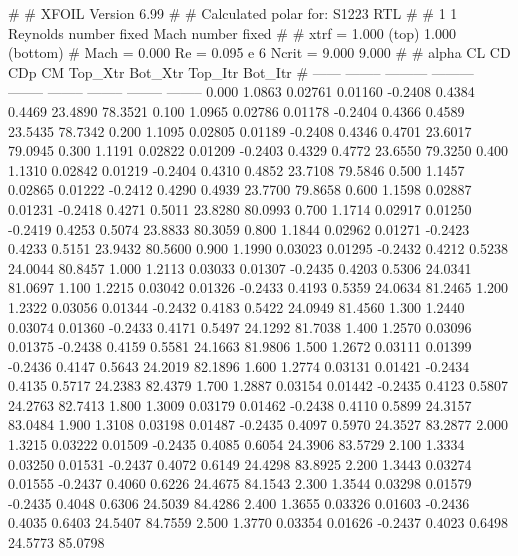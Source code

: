#  
#       XFOIL         Version 6.99
#  
# Calculated polar for: S1223 RTL                                       
#  
# 1 1 Reynolds number fixed          Mach number fixed         
#  
# xtrf =   1.000 (top)        1.000 (bottom)  
# Mach =   0.000     Re =     0.095 e 6     Ncrit =   9.000  9.000
#  
#   alpha    CL        CD       CDp       CM     Top_Xtr  Bot_Xtr  Top_Itr  Bot_Itr
#  ------ -------- --------- --------- -------- -------- -------- -------- --------
   0.000   1.0863   0.02761   0.01160  -0.2408   0.4384   0.4469  23.4890  78.3521
   0.100   1.0965   0.02786   0.01178  -0.2404   0.4366   0.4589  23.5435  78.7342
   0.200   1.1095   0.02805   0.01189  -0.2408   0.4346   0.4701  23.6017  79.0945
   0.300   1.1191   0.02822   0.01209  -0.2403   0.4329   0.4772  23.6550  79.3250
   0.400   1.1310   0.02842   0.01219  -0.2404   0.4310   0.4852  23.7108  79.5846
   0.500   1.1457   0.02865   0.01222  -0.2412   0.4290   0.4939  23.7700  79.8658
   0.600   1.1598   0.02887   0.01231  -0.2418   0.4271   0.5011  23.8280  80.0993
   0.700   1.1714   0.02917   0.01250  -0.2419   0.4253   0.5074  23.8833  80.3059
   0.800   1.1844   0.02962   0.01271  -0.2423   0.4233   0.5151  23.9432  80.5600
   0.900   1.1990   0.03023   0.01295  -0.2432   0.4212   0.5238  24.0044  80.8457
   1.000   1.2113   0.03033   0.01307  -0.2435   0.4203   0.5306  24.0341  81.0697
   1.100   1.2215   0.03042   0.01326  -0.2433   0.4193   0.5359  24.0634  81.2465
   1.200   1.2322   0.03056   0.01344  -0.2432   0.4183   0.5422  24.0949  81.4560
   1.300   1.2440   0.03074   0.01360  -0.2433   0.4171   0.5497  24.1292  81.7038
   1.400   1.2570   0.03096   0.01375  -0.2438   0.4159   0.5581  24.1663  81.9806
   1.500   1.2672   0.03111   0.01399  -0.2436   0.4147   0.5643  24.2019  82.1896
   1.600   1.2774   0.03131   0.01421  -0.2434   0.4135   0.5717  24.2383  82.4379
   1.700   1.2887   0.03154   0.01442  -0.2435   0.4123   0.5807  24.2763  82.7413
   1.800   1.3009   0.03179   0.01462  -0.2438   0.4110   0.5899  24.3157  83.0484
   1.900   1.3108   0.03198   0.01487  -0.2435   0.4097   0.5970  24.3527  83.2877
   2.000   1.3215   0.03222   0.01509  -0.2435   0.4085   0.6054  24.3906  83.5729
   2.100   1.3334   0.03250   0.01531  -0.2437   0.4072   0.6149  24.4298  83.8925
   2.200   1.3443   0.03274   0.01555  -0.2437   0.4060   0.6226  24.4675  84.1543
   2.300   1.3544   0.03298   0.01579  -0.2435   0.4048   0.6306  24.5039  84.4286
   2.400   1.3655   0.03326   0.01603  -0.2436   0.4035   0.6403  24.5407  84.7559
   2.500   1.3770   0.03354   0.01626  -0.2437   0.4023   0.6498  24.5773  85.0798

